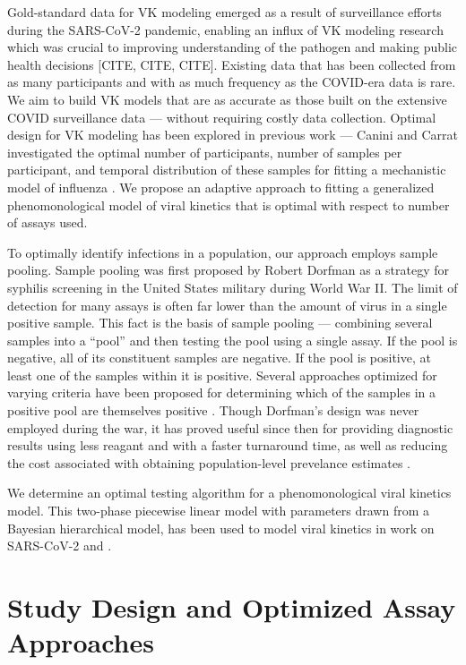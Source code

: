 \documentclass[11pt,notitlepage]{article}
\begin{document}
Gold-standard data for VK modeling emerged as a result of surveillance efforts during the SARS-CoV-2 pandemic, enabling an influx of VK modeling research which was crucial to improving understanding of the pathogen and making public health decisions [CITE, CITE, CITE].
Existing data that has been collected from as many participants and with as much frequency as the COVID-era data is rare.
We aim to build VK models that are as accurate as those built on the extensive COVID surveillance data — without requiring costly data collection.
Optimal design for VK modeling has been explored in previous work — Canini and Carrat investigated the optimal number of participants, number of samples per participant, and temporal distribution of these samples for fitting a mechanistic model of influenza \cite{canini2011viral}.
We propose an adaptive approach to fitting a generalized phenomonological model of viral kinetics that is optimal with respect to number of assays used.

To optimally identify infections in a population, our approach employs sample pooling. 
Sample pooling was first proposed by Robert Dorfman as a strategy for syphilis screening in the United States military during World War II. 
The limit of detection for many assays is often far lower  than the amount of virus in a single positive sample. 
This fact is the basis of sample pooling — combining several samples into a ``pool'' and then testing the pool using a single assay.
If the pool is negative, all of its constituent samples are negative.
If the pool is positive, at least one of the samples within it is positive.
Several approaches optimized for varying criteria have been proposed for determining which of the samples in a positive pool are themselves positive \cite{furstenau2020sample}.
Though Dorfman's design was never employed during the war, it has proved useful since then for providing diagnostic results using less reagant and with a faster turnaround time, as well as reducing the cost associated with obtaining population-level prevelance estimates \cite{grobe2021sample}.

We determine an optimal testing algorithm for a phenomonological viral kinetics model.
This two-phase piecewise linear model with parameters drawn from a Bayesian hierarchical model, has been used to model viral kinetics in work on SARS-CoV-2 \cite{kissler2023viral} and  \cite{}.


\section{Study Design and Optimized Assay Approaches}

\end{document}
